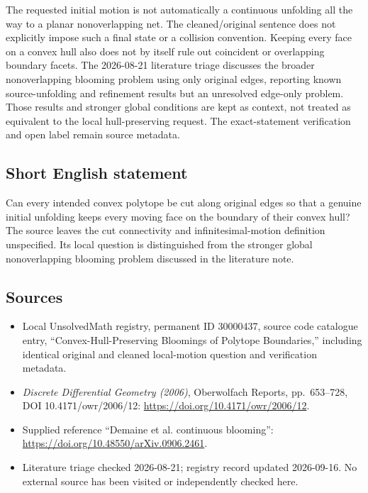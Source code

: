 \documentclass[11pt]{article}
\begin{document}
The requested initial motion is not automatically a continuous unfolding all the way to a planar nonoverlapping net. The cleaned/original sentence does not explicitly impose such a final state or a collision convention. Keeping every face on a convex hull also does not by itself rule out coincident or overlapping boundary facets. The 2026-08-21 literature triage discusses the broader nonoverlapping blooming problem using only original edges, reporting known source-unfolding and refinement results but an unresolved edge-only problem. Those results and stronger global conditions are kept as context, not treated as equivalent to the local hull-preserving request. The exact-statement verification and open label remain source metadata.
\subsection{Short English statement}
Can every intended convex polytope be cut along original edges so that a genuine initial unfolding keeps every moving face on the boundary of their convex hull? The source leaves the cut connectivity and infinitesimal-motion definition unspecified. Its local question is distinguished from the stronger global nonoverlapping blooming problem discussed in the literature note.
\subsection{Sources}
\begin{itemize}
\item Local UnsolvedMath registry, permanent ID 30000437, source code catalogue entry, ``Convex-Hull-Preserving Bloomings of Polytope Boundaries,'' including identical original and cleaned local-motion question and verification metadata.
\item \emph{Discrete Differential Geometry (2006)}, Oberwolfach Reports, pp.\ 653--728, DOI 10.4171/owr/2006/12: \url{https://doi.org/10.4171/owr/2006/12}.
\item Supplied reference ``Demaine et al. continuous blooming'': \url{https://doi.org/10.48550/arXiv.0906.2461}.
\item Literature triage checked 2026-08-21; registry record updated 2026-09-16. No external source has been visited or independently checked here.
\end{itemize}
\end{document}
